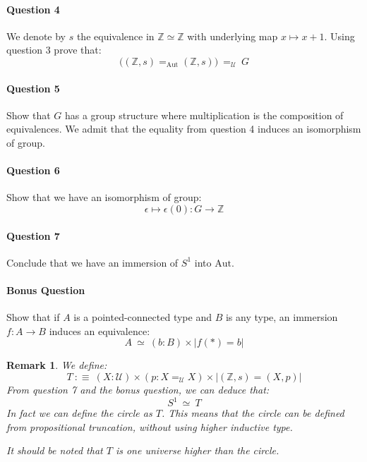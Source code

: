 \documentclass{article}[6pt]%
\newtheorem{remark}{Remark}
\begin{document}
\paragraph{Question 4} 
We denote by $s$ the equivalence in $\mathbb{Z} \simeq \mathbb{Z}$ with underlying map $x\mapsto x+1$. Using question 3 prove that:
\[\big((\mathbb{Z},s) =_{\mathrm{Aut}} (\mathbb{Z},s)\big) \ =_{\mathcal U}\ G\]

\paragraph{Question 5} 
Show that $G$ has a group structure where multiplication is the composition of equivalences. We admit that the equality from question 4 induces an isomorphism of group.

\paragraph{Question 6} 
Show that we have an isomorphism of group:
\[\epsilon \mapsto \epsilon(0) : G \rightarrow \mathbb{Z}\]

\paragraph{Question 7} 
Conclude that we have an immersion of $S^1$ into $\mathrm{Aut}$.



\paragraph{Bonus Question} Show that if $A$ is a pointed-connected type and $B$ is any type, an immersion $f: A \rightarrow B$ induces an equivalence: 
\[A\ \simeq\ (b:B)\times | f(*) = b |\]

\begin{remark} 
We define:
\[T\ :\equiv\ (X:{\mathcal U})\times (p:X=_{\mathcal U} X) \times |(\mathbb{Z},s) = (X,p)|\]
From question 7 and the bonus question, we can deduce that:
\[S^1\ \simeq\ T\]
In fact we can define the circle as $T$. This means that the circle can be defined from propositional truncation, without using higher inductive type.

It should be noted that $T$ is one universe higher than the circle. %
\end{remark}
\end{document}
